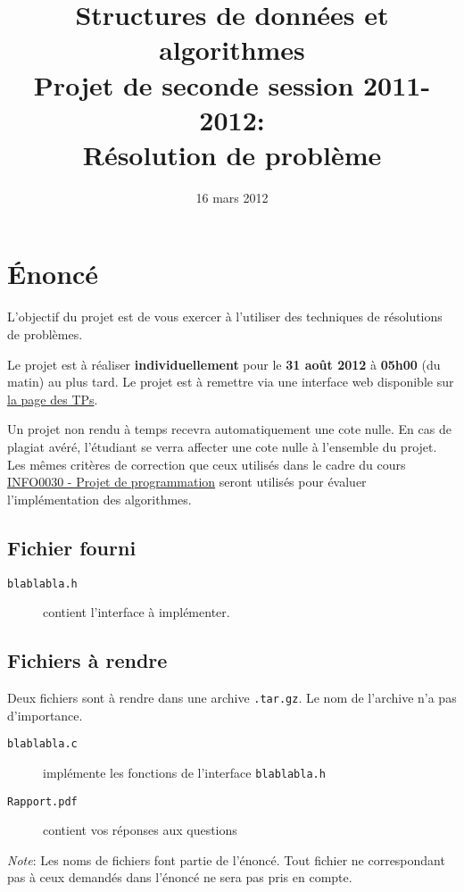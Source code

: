 \documentclass[a4paper,10pt]{article}
\title{
    \textbf{Structures de données et algorithmes}\\
    Projet de seconde session 2011-2012:\\Résolution de problème
}
\date{16 mars 2012}
\begin{document}
\maketitle

\section*{\'Enoncé}

L'objectif du projet est de vous exercer à l'utiliser des techniques de résolutions de problèmes.

Le projet est à réaliser {\bf individuellement} pour le {\bf 31 août 2012} à
{\bf 05h00} (du matin) au plus tard. Le projet est à remettre via une interface
web disponible sur \href{http://www.montefiore.ulg.ac.be/~glouppe/2011-2012/students.info0902.php}{la page des TPs}.

Un projet non rendu à temps recevra automatiquement une cote nulle. En cas de
plagiat avéré, l'étudiant se verra affecter une cote nulle à l'ensemble du
projet. Les mêmes critères de correction que ceux utilisés dans le cadre du
cours \href{http://www.montefiore.ulg.ac.be/~info0030/}{INFO0030 - Projet de programmation}
seront utilisés pour évaluer l'implémentation des algorithmes.

\subsection*{Fichier fourni}
\begin{description}
\item[\texttt{blablabla.h}] contient l'interface à implémenter.
\end{description}
\subsection*{Fichiers à rendre}
Deux fichiers sont à rendre dans une archive \texttt{.tar.gz}. Le nom de l'archive n'a pas d'importance.
\begin{description}
\item[\texttt{blablabla.c}] implémente les fonctions de l'interface \texttt{blablabla.h}
\item[\texttt{Rapport.pdf}] contient vos réponses aux questions
\end{description}

{\em Note}: Les noms de fichiers font partie de l'énoncé. Tout fichier ne
correspondant pas à ceux demandés dans l'énoncé ne sera pas pris en compte.
\end{document}
